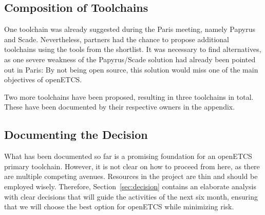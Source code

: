 \subsection{Composition of Toolchains}
\label{sec:composition_of_tool_chains}

One toolchain was already suggested during the Paris meeting, namely Papyrus and Scade.  Nevertheless, partners had the chance to propose additional toolchains using the tools from the shortlist.  It was necessary to find alternatives, as one severe weakness of the Papyrus/Scade solution had already been pointed out in Paris: By not being open source, this solution would miss one of the main objectives of openETCS.

Two more toolchains have been proposed, resulting in three toolchains in total.  These have been documented by their respective owners in the appendix.

\subsection{Documenting the Decision}
\label{sec:documenting_the_decision}

What has been documented so far is a promising foundation for an openETCS primary toolchain.  However, it is not clear on how to proceed from here, as there are multiple competing avenues.  Resources in the project are thin and should be employed wisely.  Therefore, Section~\ref{sec:decision} contains an elaborate analysis with clear decisions that will guide the activities of the next six month, ensuring that we will choose the best option for openETCS while minimizing risk.



